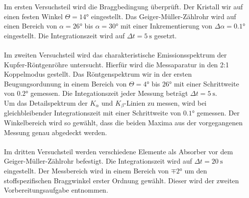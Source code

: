 Im ersten Versuchsteil wird die Braggbedingung überprüft. Der Kristall wir auf einen festen Winkel $Θ = 14°$ eingestellt.
Das Geiger-Müller-Zählrohr wird auf einen Bereich von $α = 26°$ bis $α = 30°$ mit einer Inkrementierung von $Δα = 0.1°$ eingestellt. Die Integrationszeit wird auf $Δt = \SI{5}{\second}$ gesetzt.\\
\\
Im zweiten Versuchsteil wird das charakteristische Emissionsspektrum der Kupfer-Röntgenröhre untersucht. Hierfür wird die Messaparatur in den 2:1 Koppelmodus
gestellt. Das Röntgenspektrum wir in der ersten Beugungsordunung in einem Bereich von $Θ = 4°$ bis $26°$ mit einer Schrittweite von $0.2°$ gemessen. Die Integationszeit jeder Messung beträgt $Δt = \SI{5}{\second}$.\\
Um das Detailspektrum der $K_α$ und $K_β$-Linien zu messen, wird bei gleichbleibender Integrationszeit mit einer Schrittweite von $0.1°$ gemessen. Der Winkelbereich wird so gewählt, dass die beiden Maxima aus der vorgegangenen Messung
genau abgedeckt werden.\\
\\
Im dritten Versuchsteil werden verschiedene Elemente als Absorber vor dem Geiger-Müller-Zählrohr befestigt. Die Integrationszeit wird auf $Δt = \SI{20}{\second}$ eingestellt.
Der Messbereich wird in einem Bereich von $\mp2°$ um den stoffspezifischen Braggwinkel erster Ordnung gewählt. Dieser wird der zweiten Vorbereitungsaufgabe entnommen.\\